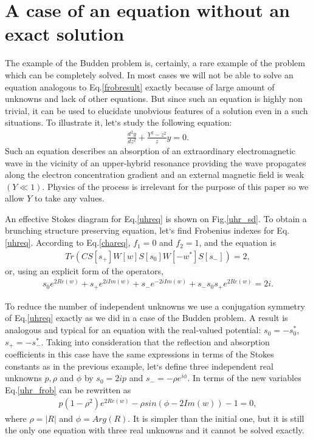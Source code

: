 \documentclass[aip,jmp,reprint]{revtex4-1}
\begin{document}
\section{A case of an equation without an exact solution \label{UHR}}
The example of the Budden problem is, certainly, a rare example of the problem which can be completely solved. In most cases we will not be able to solve an equation analogous to Eq.\ref{frobresult} exactly because of large amount of unknowns and lack of other equations. But since such an equation is highly non trivial, it can be used to elucidate unobvious features of a solution even in a such situations. To illustrate it, let`s study the following equation:
\begin{eqnarray}
\frac{d^2y}{dz^2} + \frac{Y^2-z^2}{z}y = 0.  \label{uhreq}
\end{eqnarray}
Such an equation describes an absorption of an extraordinary electromagnetic wave in the vicinity of an upper-hybrid resonance providing the wave propagates along the electron concentration gradient and an external magnetic field is weak $(Y \ll 1)$. Physics of the process is irrelevant for the purpose of this paper so we allow $Y$ to take any values.

An effective Stokes diagram for Eq.\ref{uhreq} is shown on Fig.\ref{uhr_sd}. To obtain a brunching structure preserving equation, let`s find Frobenius indexes for Eq.\ref{uhreq}. According to Eq.\ref{chareq}, $f_1=0$ and $f_2=1$, and the equation is
\begin{eqnarray}
Tr(CS[s_+]W[w]S[s_0]W[-w^*]S[s_-])=2,  
\end{eqnarray}
or, using an explicit form of the operators,
\begin{eqnarray}
s_0e^{2Re(w)} + s_+e^{2iIm(w)} + s_-e^{-2iIm(w)} +s_-s_0s_+e^{2Re(w)}=2i.   \label{uhr_frob}
\end{eqnarray}

To reduce the number of independent unknowns we use a conjugation symmetry of Eq.\ref{uhreq} exactly as we did in a case of the Budden problem. A result is analogous and typical for an equation with the real-valued potential: $s_0=-s_0^*$, $s_+=-s_-^*$. Taking into consideration that the reflection and absorption coefficients in this case have the same expressions in terms of the Stokes constants as in the previous example, let`s define three independent real unknowns $p, \rho$ and $\phi$ by $s_0=2ip$ and $s_-=-\rho e^{i\phi}$. In terms of the new variables Eq.\ref{uhr_frob} can be rewritten as
\begin{eqnarray}
p (1-\rho^2) e^{2Re(w)} - \rho sin(\phi-2Im(w)) - 1 = 0,   \label{realFrobEq}
\end{eqnarray}
where $\rho=|R|$ and $\phi=Arg(R)$. It is simpler than the initial one, but it is still the only one equation with three real unknowns and it cannot be solved exactly.
\end{document}
